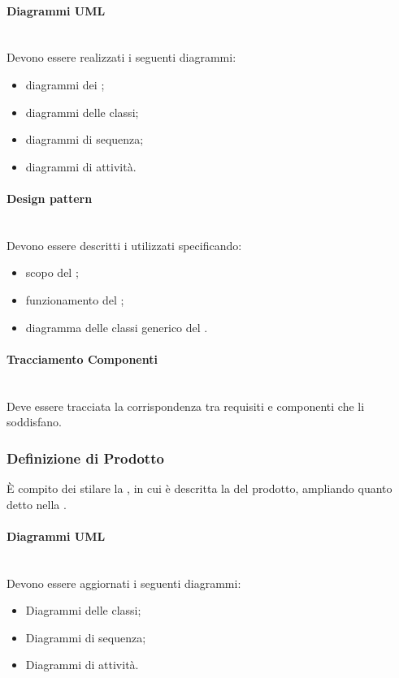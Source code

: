 \paragraph{Diagrammi UML}\mbox{}\\
Devono essere realizzati i seguenti diagrammi:
\begin{itemize}
\item diagrammi dei ;
\item diagrammi delle classi;
\item diagrammi di sequenza;
\item diagrammi di attività.
\end{itemize}

\paragraph{Design pattern}\mbox{}\\
Devono essere descritti i  utilizzati specificando:
\begin{itemize}
	\item scopo del ;
	\item funzionamento del ;
	\item diagramma delle classi generico del .
\end{itemize}

\paragraph{Tracciamento Componenti}\mbox{}\\
Deve essere tracciata la corrispondenza tra requisiti e componenti che li soddisfano.

\subsubsection{Definizione di Prodotto}
\`{E} compito dei \Progettisti{} stilare la \DefinizioneDiProdotto, in cui è descritta la \PD{} del prodotto, ampliando quanto detto nella \SpecificaTecnica.

\paragraph{Diagrammi UML}\mbox{}\\
Devono essere aggiornati i seguenti diagrammi:
\begin{itemize}
\item Diagrammi delle classi;
\item Diagrammi di sequenza;
\item Diagrammi di attività.
\end{itemize}

